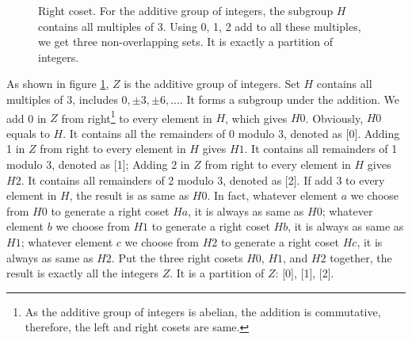 \documentclass[b5paper]{article}
\begin{document}
\begin{figure}[htbp]
\centering
{}
\caption{Right coset. For the additive group of integers, the subgroup $H$ contains all multiples of 3. Using 0, 1, 2 add to all these multiples, we get three non-overlapping sets. It is exactly a partition of integers.}
\label{fig:right-cosets-Z3}
\end{figure}

As shown in figure \ref{fig:right-cosets-Z3}, $Z$ is the additive group of integers. Set $H$ contains all multiples of 3, includes $0, \pm 3, \pm 6, ...$. It forms a subgroup under the addition. We add 0 in $Z$ from right\footnote{As the additive group of integers is abelian, the addition is commutative, therefore, the left and right cosets are same.} to every element in $H$, which gives $H0$. Obviously, $H0$ equals to $H$. It contains all the remainders of 0 modulo 3, denoted as [0]. Adding 1 in $Z$ from right to every element in $H$ gives $H1$. It contains all remainders of 1 modulo 3, denoted as [1]; Adding 2 in $Z$ from right to every element in $H$ gives $H2$. It contains all remainders of 2 modulo 3, denoted as [2]. If add 3 to every element in $H$, the result is as same as $H0$. In fact, whatever element $a$ we choose from $H0$ to generate a right coset $Ha$, it is always as same as $H0$; whatever element $b$ we choose from $H1$ to generate a right coset $Hb$, it is always as same as $H1$; whatever element $c$ we choose from $H2$ to generate a right coset $Hc$, it is always as same as $H2$. Put the three right cosets $H0$, $H1$, and $H2$ together, the result is exactly all the integers $Z$. It is a partition of $Z$: [0], [1], [2].
\end{document}
